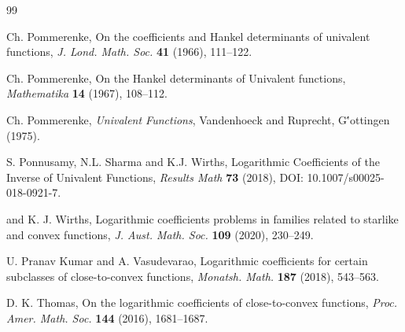 \documentclass[a4paper,12pt]{amsart}
\theoremstyle{definition}
\numberwithin{equation}{section}
\begin{document}
\begin{thebibliography}{99}
	
	 {\sc Ch. Pommerenke},
	{On the coefficients and Hankel determinants of univalent functions},
	{\em J. Lond. Math. Soc.} \textbf{41} (1966), 111--122.
	
	 {\sc Ch. Pommerenke},
	{On the Hankel determinants of Univalent functions},
	{\em Mathematika} \textbf{14} (1967), 108--112.
	
{\sc Ch. Pommerenke}, {\it Univalent Functions}, Vandenhoeck and Ruprecht,  G\''{o}ttingen (1975).	
	
	{\sc S. Ponnusamy}, {\sc N.L.  Sharma} and {\sc K.J. Wirths}, Logarithmic Coefficients of the Inverse of Univalent Functions, {\it Results Math} {\bf 73} (2018), DOI: 10.1007/s00025-018-0921-7.
	
	 and {\sc K. J. Wirths},
	{Logarithmic coefficients problems in families related to starlike and convex functions},
	{\em J. Aust. Math. Soc.} {\bf 109} (2020), 230--249.
	
	{\sc U. Pranav Kumar} and {\sc A. Vasudevarao}, Logarithmic coefficients for certain subclasses of close-to-convex functions, {\it Monatsh. Math.} {\bf 187} (2018), 543--563.
	
	
	
	
	
	{\sc D. K. Thomas}, On the logarithmic coefficients of close-to-convex functions, {\it Proc. Amer. Math. Soc.} {\bf 144} (2016), 1681--1687.
	
	
  
	





	
	
	
%	
	
	
		
	
	
	
	
	
	
	
	
	
	
	

	
\end{thebibliography}
\end{document}
